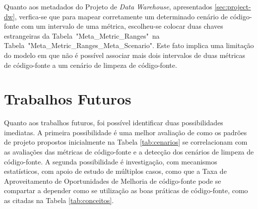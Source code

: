 Quanto aos metadados do Projeto de \textit{Data Warehouse}, apresentados \ref{sec:project-dw}, verfica-se que para mapear corretamente um determinado cenário de código-fonte com um intervalo de uma métrica, escolheu-se colocar duas chaves estrangeiras da Tabela~"Meta\_Metric\_Ranges"~na Tabela~"Meta\_Metric\_Ranges\_Meta\_Scenario". Este fato implica uma limitação do modelo em que não é possível associar mais dois intervalos de  duas métricas de código-fonte a um cenário de limpeza de código-fonte.  


\section{Trabalhos Futuros}

Quanto aos trabalhos futuros, foi possível identificar duas possibilidades imediatas. A primeira possibilidade é uma melhor avaliação de como os padrões de projeto propostos inicialmente na Tabela \ref{tab:cenarios} se correlacionam com as avaliações das métricas de código-fonte e a detecção dos cenários de limpeza de código-fonte. A segunda possibilidade é investigação, com mecanismos estatísticos, com apoio de estudo de múltiplos casos, como que a Taxa de Aproveitamento de Oportunidades de Melhoria de código-fonte pode se compartar a depender como se utilização as boas práticas de código-fonte, como as citadas na Tabela \ref{tab:conceitos}.